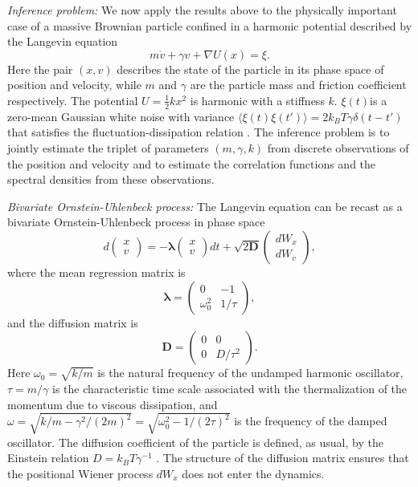 \documentclass[english,aps, twocolumn, pre,superscriptaddress, notitlepage]{revtex4-1}
\begin{document}
\emph{Inference problem: }We now apply the results above to the physically
important case of a massive Brownian particle confined in a harmonic
potential described by the Langevin equation
\begin{equation}
m\dot{v}+\gamma v+\nabla U(x)=\xi.\label{eq:langevin}
\end{equation}
Here the pair $(x,v)$ describes the state of the particle in its
phase space of position and velocity, while $m$ and $\gamma$ are
the particle mass and friction coefficient respectively. The potential
$U=\frac{1}{2}kx^{2}$ is harmonic with a stiffness $k$. $\xi\left(t\right)$is
a zero-mean Gaussian white noise with variance $\langle\xi\left(t\right)\xi\left(t'\right)\rangle=2k_{B}T\gamma\delta\left(t-t'\right)$
that satisfies the fluctuation-dissipation relation \cite{chandrasekhar1943stochastic}.
The inference problem is to jointly estimate the triplet of parameters
$(m,\gamma,k)$ from discrete observations of the position and velocity
and to estimate the correlation functions and the spectral densities
from these observations. 

\emph{Bivariate Ornstein-Uhlenbeck process: }The Langevin equation
can be recast as a bivariate Ornstein-Uhlenbeck process in phase space
\begin{equation}
d\left(\begin{array}{c}
x\\
v
\end{array}\right)=-\bm{\lambda}\left(\begin{array}{c}
x\\
v
\end{array}\right)dt+\sqrt{2\boldsymbol{D}}\left(\begin{array}{c}
dW_{x}\\
dW_{v}
\end{array}\right),\label{eq:phase_space}
\end{equation}
where the mean regression matrix is
\begin{equation}
\bm{\lambda}=\begin{pmatrix}0 & -1\\
\omega_{0}^{2} & 1/\tau
\end{pmatrix},
\end{equation}
and the diffusion matrix is
\begin{equation}
\bm{D=}\begin{pmatrix}0 & 0\\
0 & D/\tau^{2}
\end{pmatrix}.
\end{equation}
Here $\omega_{0}=\sqrt{k/m}$ is the natural frequency of the undamped
harmonic oscillator, $\tau=m/\gamma$ is the characteristic time scale
associated with the thermalization of the momentum due to viscous
dissipation, and $\omega=\sqrt{k/m-\gamma^{2}/(2m)^{2}}=\sqrt{\omega_{0}^{2}-1/(2\tau)^{2}}$
is the frequency of the damped oscillator. The diffusion coefficient
of the particle is defined, as usual, by the Einstein relation $D=k_{B}T\gamma^{-1}$
\cite{einstein1905theory,kubo1966fluctuation}. The structure of the
diffusion matrix ensures that the positional Wiener process $dW_{x}$
does not enter the dynamics. 
\end{document}
